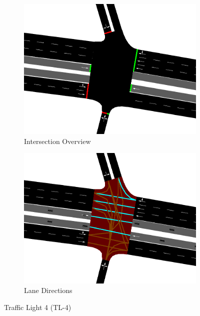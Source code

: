 \begin{figure}[h]
    \centering
    \begin{subfigure}{0.45\textwidth}
        \centering
        \includegraphics[width=\linewidth]{images/methodology/tl-4-street.png}
        \caption{Intersection Overview}
    \end{subfigure}
    \hfill
    \begin{subfigure}{0.45\textwidth}
        \centering
        \includegraphics[width=\linewidth]{images/methodology/tl-4-directions.png}
        \caption{Lane Directions}
    \end{subfigure}
    \caption{Traffic Light 4 (TL-4)}
    \label{fig:tl-4}
\end{figure}

